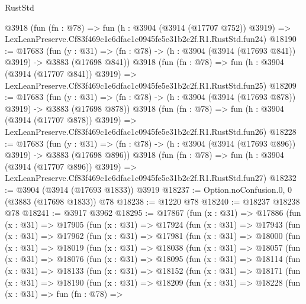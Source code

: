 \begin{lexlean}{RustStd}
\begin{coremodule}
    @3918
    (fun (fn : @78) =>
    fun (h : @3904 (@3914 (@17707 @752)) @3919) =>
    LexLeanPreserve.Cf83f469c1e6dfac1c0945fe5e31b2c2f.R1.RustStd.fun24)
@18190 := @17683
    (fun (y : @31) => (fn : @78) -> (h : @3904 (@3914 (@17693 @841)) @3919) -> @3883 (@17698 @841))
    @3918
    (fun (fn : @78) =>
    fun (h : @3904 (@3914 (@17707 @841)) @3919) =>
    LexLeanPreserve.Cf83f469c1e6dfac1c0945fe5e31b2c2f.R1.RustStd.fun25)
@18209 := @17683
    (fun (y : @31) => (fn : @78) -> (h : @3904 (@3914 (@17693 @878)) @3919) -> @3883 (@17698 @878))
    @3918
    (fun (fn : @78) =>
    fun (h : @3904 (@3914 (@17707 @878)) @3919) =>
    LexLeanPreserve.Cf83f469c1e6dfac1c0945fe5e31b2c2f.R1.RustStd.fun26)
@18228 := @17683
    (fun (y : @31) => (fn : @78) -> (h : @3904 (@3914 (@17693 @896)) @3919) -> @3883 (@17698 @896))
    @3918
    (fun (fn : @78) =>
    fun (h : @3904 (@3914 (@17707 @896)) @3919) =>
    LexLeanPreserve.Cf83f469c1e6dfac1c0945fe5e31b2c2f.R1.RustStd.fun27)
@18232 := @3904 (@3914 (@17693 @1833)) @3919
@18237 := Option.noConfusion.{0, 0} (@3883 (@17698 @1833)) @78
@18238 := @1220 @78
@18240 := @18237 @18238 @78
@18241 := @3917 @3962
@18295 := @17867
    (fun (x : @31) =>
    @17886
      (fun (x : @31) =>
      @17905
        (fun (x : @31) =>
        @17924
          (fun (x : @31) =>
          @17943
            (fun (x : @31) =>
            @17962
              (fun (x : @31) =>
              @17981
                (fun (x : @31) =>
                @18000
                  (fun (x : @31) =>
                  @18019
                    (fun (x : @31) =>
                    @18038
                      (fun (x : @31) =>
                      @18057
                        (fun (x : @31) =>
                        @18076
                          (fun (x : @31) =>
                          @18095
                            (fun (x : @31) =>
                            @18114
                              (fun (x : @31) =>
                              @18133
                                (fun (x : @31) =>
                                @18152
                                  (fun (x : @31) =>
                                  @18171
                                    (fun (x : @31) =>
                                    @18190
                                      (fun (x : @31) =>
                                      @18209
                                        (fun (x : @31) =>
                                        @18228
                                          (fun (x : @31) =>
                                          fun (fn : @78) =>

\end{coremodule}
\end{lexlean}

